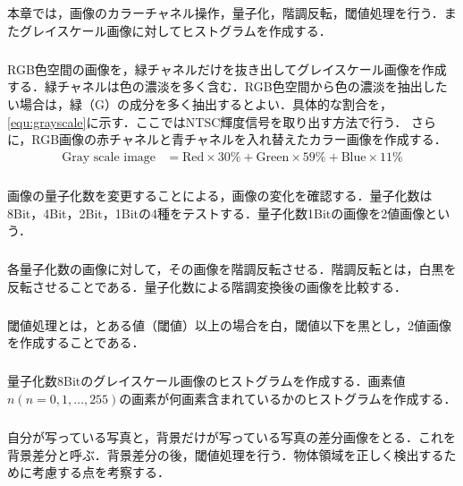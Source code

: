 \chapter{\kadaia}
\section{\purpose}
本章では，画像のカラーチャネル操作，量子化，階調反転，閾値処理を行う．またグレイスケール画像に対してヒストグラムを作成する．
\paragraph{\kadaiaa}RGB色空間の画像を，緑チャネルだけを抜き出してグレイスケール画像を作成する．緑チャネルは色の濃淡を多く含む．RGB色空間から色の濃淡を抽出したい場合は，緑（G）の成分を多く抽出するとよい．具体的な割合を，\eqref{equ:grayscale}に示す．ここではNTSC輝度信号を取り出す方法で行う．
さらに，RGB画像の赤チャネルと青チャネルを入れ替えたカラー画像を作成する．
\begin{align}
    \textrm{Gray scale image} & = \textrm{Red}\times 30\% +\textrm{Green}\times 59\% +\textrm{Blue}\times 11\%\label{equ:grayscale}
\end{align}
\paragraph{\kadaiab}画像の量子化数を変更することによる，画像の変化を確認する．量子化数は8Bit，4Bit，2Bit，1Bitの4種をテストする．量子化数1Bitの画像を2値画像という．
\paragraph{\kadaiac}各量子化数の画像に対して，その画像を階調反転させる．階調反転とは，白黒を反転させることである．量子化数による階調変換後の画像を比較する．
\paragraph{\kadaiad}閾値処理とは，とある値（閾値）以上の場合を白，閾値以下を黒とし，2値画像を作成することである．
\paragraph{\kadaiae}量子化数8Bitのグレイスケール画像のヒストグラムを作成する．画素値\(n(n=0,1,\dots ,255)\)の画素が何画素含まれているかのヒストグラムを作成する．
\paragraph{\kadaiaf}自分が写っている写真と，背景だけが写っている写真の差分画像をとる．これを背景差分と呼ぶ．背景差分の後，閾値処理を行う．物体領域を正しく検出するために考慮する点を考察する．
